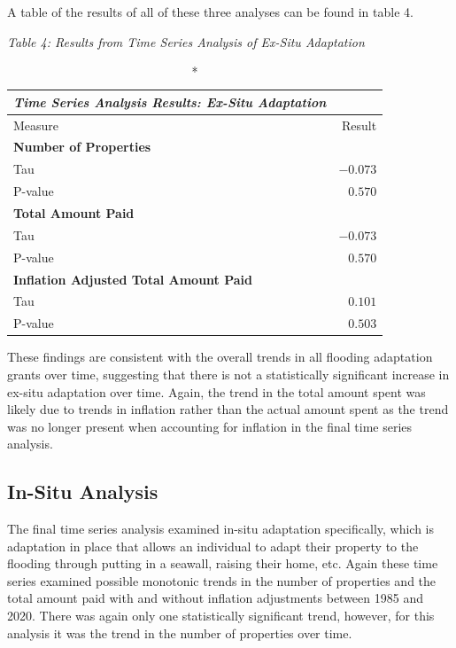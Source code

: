 \documentclass[
  12pt,
]{article}
\begin{document}
\newpage

A table of the results of all of these three analyses can be found in
table 4.

\emph{Table 4: Results from Time Series Analysis of Ex-Situ
Adaptation}\\
\captionsetup[table]{labelformat=empty,skip=1pt}

\begin{longtable}{lr}
\caption*{
{\large \emph{\textbf{Time Series Analysis Results: Ex-Situ Adaptation}}}
} \\ 
\toprule
Measure & Result \\ 
\midrule
\multicolumn{1}{l}{\textbf{Number of Properties}} \\ 
\midrule
Tau & $-0.073$ \\ 
P-value & $0.570$ \\ 
\midrule
\multicolumn{1}{l}{\textbf{Total Amount Paid}} \\ 
\midrule
Tau & $-0.073$ \\ 
P-value & $0.570$ \\ 
\midrule
\multicolumn{1}{l}{\textbf{Inflation Adjusted Total Amount Paid}} \\ 
\midrule
Tau & $0.101$ \\ 
P-value & $0.503$ \\ 
\bottomrule
\end{longtable}

These findings are consistent with the overall trends in all flooding
adaptation grants over time, suggesting that there is not a
statistically significant increase in ex-situ adaptation over time.
Again, the trend in the total amount spent was likely due to trends in
inflation rather than the actual amount spent as the trend was no longer
present when accounting for inflation in the final time series analysis.

\hypertarget{in-situ-analysis}{%
\subsection{In-Situ Analysis}\label{in-situ-analysis}}

The final time series analysis examined in-situ adaptation specifically,
which is adaptation in place that allows an individual to adapt their
property to the flooding through putting in a seawall, raising their
home, etc. Again these time series examined possible monotonic trends in
the number of properties and the total amount paid with and without
inflation adjustments between 1985 and 2020. There was again only one
statistically significant trend, however, for this analysis it was the
trend in the number of properties over time.
\end{document}
